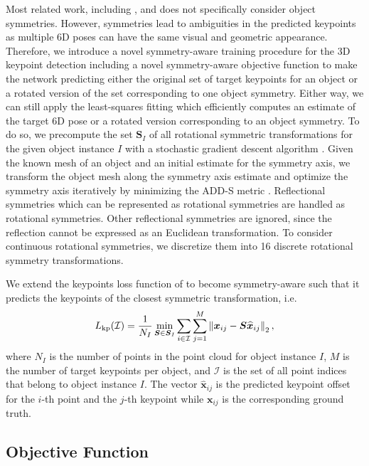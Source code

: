 Most related work, including \cite{pvn3d, ffb6d}, and \cite{mv6d} does not specifically consider object symmetries. 
However, symmetries lead to ambiguities in the predicted keypoints as multiple 6D poses can have the same visual and geometric appearance. 
Therefore, we introduce a novel symmetry-aware training procedure for the 3D keypoint detection including a novel symmetry-aware objective function to make the network predicting either the original set of target keypoints for an object or a rotated version of the set corresponding to one object symmetry. Either way, we can still apply the least-squares fitting which efficiently computes an estimate of the target 6D pose or a rotated version corresponding to an object symmetry. To do so, we precompute the set $\boldsymbol{S}_I$ of all rotational symmetric transformations for the given object instance $I$ with a stochastic gradient
descent algorithm \cite{sgdr}.
Given the known mesh of an object and an initial estimate for the symmetry axis, we transform the object mesh along the symmetry axis estimate and optimize the symmetry axis iteratively by minimizing the ADD-S metric \cite{hinterstoisser2012model}.
Reflectional symmetries which can be represented as rotational symmetries are handled as rotational symmetries. 
Other reflectional symmetries are ignored, since the reflection cannot be expressed as an Euclidean transformation.
To consider continuous rotational symmetries, we discretize them into 16 discrete rotational symmetry transformations.

We extend the keypoints loss function of \cite{pvn3d} to become symmetry-aware such that it predicts the keypoints of the closest symmetric transformation, i.e. 
\begin{equation}
    L_\text{kp}(\mathcal{I}) = \frac{1}{N_I} 
    \min_{\boldsymbol{S} \in \boldsymbol{S}_I} 
    \sum_{i \in \mathcal{I}} \sum_{j=1}^M 
    \left\lVert\boldsymbol{x}_{ij} - \boldsymbol{S}\boldsymbol{\widehat{x}}_{ij}\right\rVert_2, 
\label{eq_keypoint_loss}
\end{equation}
where $N_I$ is the number of points in the point cloud for object instance $I$, $M$ is the number of target keypoints per object, and $\mathcal{I}$ is the set of all point indices that belong to object instance $I$.  
The vector $\boldsymbol{\widehat{x}}_{ij}$ is the predicted keypoint offset for the $i$-th point and the $j$-th keypoint while $\boldsymbol{x}_{ij}$ is the corresponding ground truth. 



\subsection{Objective Function}

